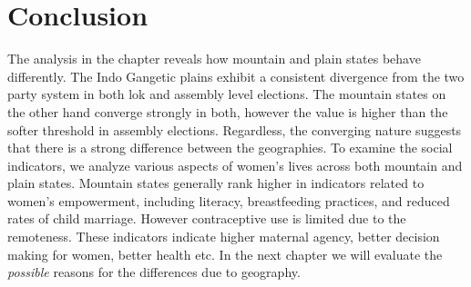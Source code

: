 \section{Conclusion}
The analysis in the chapter reveals how mountain and plain states behave differently. The Indo Gangetic plains exhibit a consistent divergence from the two party system in both lok and assembly level elections. The mountain states on the other hand converge strongly in both, however the value is higher than the softer threshold in assembly elections. Regardless, the converging nature suggests that there is a strong difference between the geographies. To examine the social indicators, we analyze various aspects of women's lives across both mountain and plain states. Mountain states generally rank higher in indicators related to women's empowerment, including literacy, breastfeeding practices, and reduced rates of child marriage. However contraceptive use is limited due to the remoteness. These indicators indicate higher maternal agency, better decision making for women, better health etc. In the next chapter we will evaluate the \textit{possible} reasons for the differences due to geography.